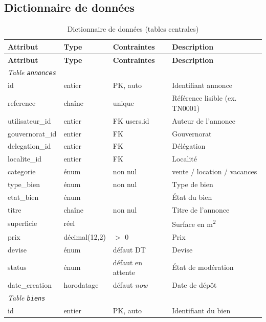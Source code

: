 \subsection{Dictionnaire de données}
\begin{longtable}{p{2.8cm} p{2.5cm} p{2cm} p{5.4cm}}
\caption{Dictionnaire de données (tables centrales)}\label{tab:dictionnaire}\\
\toprule
\textbf{Attribut} & \textbf{Type} & \textbf{Contraintes} & \textbf{Description} \\
\midrule
\endfirsthead
\toprule
\textbf{Attribut} & \textbf{Type} & \textbf{Contraintes} & \textbf{Description} \\
\midrule
\endhead
\multicolumn{4}{l}{\textit{Table \texttt{annonces}}}\\
id            & entier        & PK, auto       & Identifiant annonce \\
reference     & chaîne        & unique         & Référence lisible (ex. TN0001) \\
utilisateur\_id & entier      & FK users.id    & Auteur de l'annonce \\
gouvernorat\_id & entier      & FK             & Gouvernorat \\
delegation\_id & entier       & FK             & Délégation \\
localite\_id  & entier        & FK             & Localité \\
categorie     & énum          & non nul        & vente / location / vacances \\
type\_bien    & énum          & non nul        & Type de bien \\
etat\_bien    & énum          &                & État du bien \\
titre         & chaîne        & non nul        & Titre de l'annonce \\
superficie    & réel          &                & Surface en m\textsuperscript{2} \\
prix          & décimal(12,2) & $>$ 0          & Prix \\
devise        & énum          & défaut DT      & Devise \\
status        & énum          & défaut en attente & État de modération \\
date\_creation & horodatage   & défaut \emph{now} & Date de dépôt \\
\midrule
\multicolumn{4}{l}{\textit{Table \texttt{biens}}}\\
id            & entier        & PK, auto       & Identifiant du bien \\

\end{longtable}
